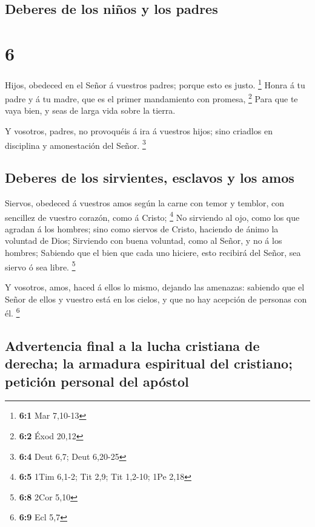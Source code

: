 \hypertarget{deberes-de-los-niuxf1os-y-los-padres}{%
\subsection{Deberes de los niños y los
padres}\label{deberes-de-los-niuxf1os-y-los-padres}}

\hypertarget{section-5}{%
\section{6}\label{section-5}}

 Hijos, obedeced en el Señor á vuestros padres; porque esto
es justo. \footnote{\textbf{6:1} Mar 7,10-13}  Honra á tu
padre y á tu madre, que es el primer mandamiento con promesa,
\footnote{\textbf{6:2} Éxod 20,12}  Para que te vaya bien, y
seas de larga vida sobre la tierra.

 Y vosotros, padres, no provoquéis á ira á vuestros hijos;
sino criadlos en disciplina y amonestación del Señor. \footnote{\textbf{6:4}
  Deut 6,7; Deut 6,20-25}

\hypertarget{deberes-de-los-sirvientes-esclavos-y-los-amos}{%
\subsection{Deberes de los sirvientes, esclavos y los
amos}\label{deberes-de-los-sirvientes-esclavos-y-los-amos}}

 Siervos, obedeced á vuestros amos según la carne con temor
y temblor, con sencillez de vuestro corazón, como á Cristo; \footnote{\textbf{6:5}
  1Tim 6,1-2; Tit 2,9; Tit 1,2-10; 1Pe 2,18}  No sirviendo
al ojo, como los que agradan á los hombres; sino como siervos de Cristo,
haciendo de ánimo la voluntad de Dios;  Sirviendo con buena
voluntad, como al Señor, y no á los hombres;  Sabiendo que
el bien que cada uno hiciere, esto recibirá del Señor, sea siervo ó sea
libre. \footnote{\textbf{6:8} 2Cor 5,10}

 Y vosotros, amos, haced á ellos lo mismo, dejando las
amenazas: sabiendo que el Señor de ellos y vuestro está en los cielos, y
que no hay acepción de personas con él. \footnote{\textbf{6:9} Ecl 5,7}

\hypertarget{advertencia-final-a-la-lucha-cristiana-de-derecha-la-armadura-espiritual-del-cristiano-peticiuxf3n-personal-del-apuxf3stol}{%
\subsection{Advertencia final a la lucha cristiana de derecha; la
armadura espiritual del cristiano; petición personal del
apóstol}\label{advertencia-final-a-la-lucha-cristiana-de-derecha-la-armadura-espiritual-del-cristiano-peticiuxf3n-personal-del-apuxf3stol}}

